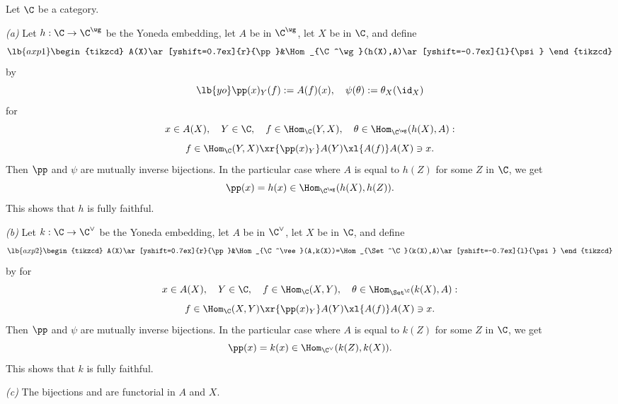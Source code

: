 \documentclass[12pt]{article}
\theoremstyle{remark}
\theoremstyle{definition}
\begin{document}
\begin{thm}
Let $\C$ be a category.

\nn\emph{(a)} Let $h:\C\to\C^\wg$ be the Yoneda embedding, let $A$ be in $\C^\wg$, let $X$ be in $\C$, and define 
\begin{equation}\lb{axp1}
\begin{tikzcd} 
A(X)\ar[yshift=0.7ex]{r}{\pp}&\Hom_{\C^\wg}(h(X),A)\ar[yshift=-0.7ex]{l}{\psi}
\end{tikzcd}
\end{equation} 
by 
\begin{equation}\lb{yo}
\pp(x)_Y(f):=A(f)(x),\quad\psi(\theta):=\theta_X(\id_X)
\end{equation}
for 
$$
x\in A(X),\quad Y\in\C,\quad f\in\Hom_\C(Y,X),\quad\theta\in\Hom_{\C^\wg}(h(X),A):
$$ 
$$
f\in\Hom_\C(Y,X)\xr{\pp(x)_Y}A(Y)\xl{A(f)}A(X)\ni x.
$$
Then $\pp$ and $\psi$ are mutually inverse bijections. In the particular case where $A$ is equal to $h(Z)$ for some $Z$ in $\C$, we get 
$$
\pp(x)=h(x)\in\Hom_{\C^\wg}(h(X),h(Z)).
$$
This shows that $h$ is fully faithful.

\nn\emph{(b)} Let $k:\C\to\C^\vee$ be the Yoneda embedding, let $A$ be in $\C^\vee$, let $X$ be in $\C$, and define 
\begin{equation}\lb{axp2}
\begin{tikzcd} 
A(X)\ar[yshift=0.7ex]{r}{\pp}&\Hom_{\C^\vee}(A,k(X))=\Hom_{\Set^\C}(k(X),A)\ar[yshift=-0.7ex]{l}{\psi}
\end{tikzcd}
\end{equation}
by  for 
$$
x\in A(X),\quad Y\in\C,\quad f\in\Hom_\C(X,Y),\quad\theta\in\Hom_{\Set^\C}(k(X),A):
$$ 
$$
f\in\Hom_\C(X,Y)\xr{\pp(x)_Y}A(Y)\xl{A(f)}A(X)\ni x.
$$
Then $\pp$ and $\psi$ are mutually inverse bijections. In the particular case where $A$ is equal to $k(Z)$ for some $Z$ in $\C$, we get 
$$
\pp(x)=k(x)\in\Hom_{\C^\vee}(k(Z),k(X)).
$$
This shows that $k$ is fully faithful.

\nn\emph{(c)} The bijections  and  are functorial in $A$ and $X$.
\end{thm}
\end{document}
